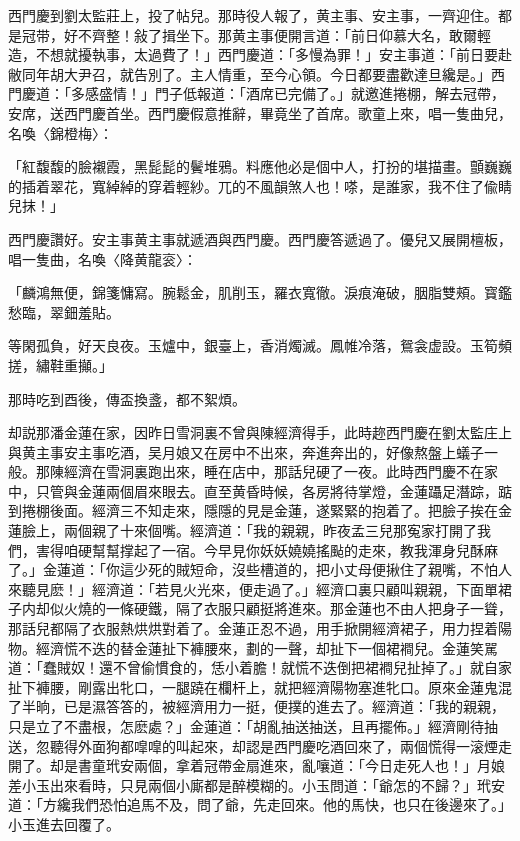 西門慶到劉太監莊上，投了帖兒。那時役人報了，黄主事、安主事，一齊迎住。都是冠带，好不齊整！敍了揖坐下。那黄主事便開言道：「前日仰慕大名，敢爾輕造，不想就擾執事，太過費了！」西門慶道：「多慢為罪！」安主事道：「前日要赴敝同年胡大尹召，就告別了。主人情重，至今心領。今日都要盡歡達旦纔是。」西門慶道：「多感盛情！」門子低報道：「酒席已完備了。」就邀進捲棚，解去冠帶，安席，送西門慶首坐。西門慶假意推辭，畢竟坐了首席。歌童上來，唱一隻曲兒，名喚〈錦橙梅〉：

\begin{myquote}
「紅馥馥的臉襯霞，黑髭髭的鬢堆鴉。料應他必是個中人，打扮的堪描畫。顫巍巍的插着翠花，寬綽綽的穿着輕紗。兀的不風韻煞人也！嗏，是誰家，我不住了偸睛兒抹！」
\end{myquote}

西門慶讚好。安主事黄主事就遞酒與西門慶。西門慶答遞過了。優兒又展開檀板，唱一隻曲，名喚〈降黄龍衮〉：

\begin{myquote}
「麟鴻無便，錦箋慵寫。腕鬆金，肌削玉，羅衣寬徹。淚痕淹破，胭脂雙頰。寳鑑愁臨，翠鈿羞貼。

等閑孤負，好天良夜。玉爐中，銀臺上，香消燭滅。鳳帷冷落，鴛衾虚設。玉筍頻搓，繡鞋重攧。」
\end{myquote}

那時吃到酉後，傳盃換盞，都不絮煩。

却説那潘金蓮在家，因昨日雪洞裏不曾與陳經濟得手，此時趂西門慶在劉太監庄上與黄主事安主事吃酒，吴月娘又在房中不出來，奔進奔出的，好像熬盤上蟻子一般。那陳經濟在雪洞裏跑出來，睡在店中，那話兒硬了一夜。此時西門慶不在家中，只管與金蓮兩個眉來眼去。直至黄昏時候，各房將待掌燈，金蓮躡足潛踪，踮到捲棚後面。經濟三不知走來，隱隱的見是金蓮，遂緊緊的抱着了。把臉子挨在金蓮臉上，兩個親了十來個嘴。經濟道：「我的親親，昨夜孟三兒那寃家打開了我們，害得咱硬幫幫撑起了一宿。今早見你妖妖嬈嬈搖颭的走來，教我渾身兒酥麻了。」金蓮道：「你這少死的賊短命，沒些槽道的，把小丈母便揪住了親嘴，不怕人來聽見麽！」經濟道：「若見火光來，便走過了。」經濟口裏只顧叫親親，下面單裙子内却似火燒的一條硬鐵，隔了衣服只顧挺將進來。那金蓮也不由人把身子一聳，那話兒都隔了衣服熱烘烘對着了。金蓮正忍不過，用手掀開經濟裙子，用力捏着陽物。經濟慌不迭的替金蓮扯下褲腰來，劃的一聲，却扯下一個裙襇兒。金蓮笑駡道：「蠢賊奴！還不曾偷慣食的，恁小着膽！就慌不迭倒把裙襇兒扯掉了。」就自家扯下褲腰，剛露出牝口，一腿蹺在欄杆上，就把經濟陽物塞進牝口。原來金蓮鬼混了半晌，已是濕答答的，被經濟用力一挺，便撲的進去了。經濟道：「我的親親，只是立了不盡根，怎麽處？」金蓮道：「胡亂抽送抽送，且再擺佈。」經濟剛待抽送，忽聽得外面狗都噑噑的叫起來，却認是西門慶吃酒回來了，兩個慌得一滚煙走開了。却是書童玳安兩個，拿着冠帶金扇進來，亂嚷道：「今日走死人也！」月娘差小玉出來看時，只見兩個小廝都是醉模糊的。小玉問道：「爺怎的不歸？」玳安道：「方纔我們恐怕追馬不及，問了爺，先走回來。他的馬快，也只在後邊來了。」小玉進去回覆了。

